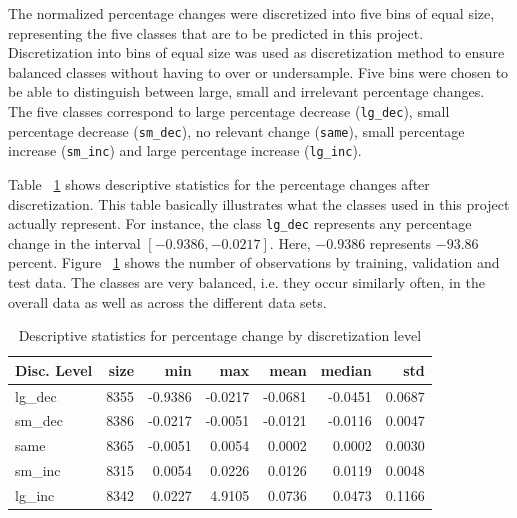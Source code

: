 \documentclass{article}
\begin{document}
	The normalized percentage changes were discretized into five bins of equal size, representing the five classes that are to be predicted in this project. Discretization into bins of equal size was used as discretization method to ensure balanced classes without having to over or undersample. Five bins were chosen to be able to distinguish between large, small and irrelevant percentage changes. The five classes correspond to large percentage decrease (\lstinline{lg_dec}), small percentage decrease (\lstinline{sm_dec}), no relevant change (\lstinline{same}), small percentage increase (\lstinline{sm_inc}) and large percentage increase (\lstinline{lg_inc}).
	
	Table ~\ref{table:stats_by_target} shows descriptive statistics for the percentage changes after discretization. This table basically illustrates what the classes used in this project actually represent. For instance, the class  \lstinline{lg_dec} represents any percentage change in the interval $[-0.9386, -0.0217]$. Here, $-0.9386$ represents $-93.86$ percent. Figure ~\ref{table:stats_by_target} shows the number of observations by training, validation and test data. The classes are very balanced, i.e. they occur similarly often, in the overall data as well as across the different data sets.
	
	\begin{table}[h!]
		\centering
		\caption{Descriptive statistics for percentage change by discretization level}
		\label{table:stats_by_target}
	
		\begin{tabular}{lrrrrrr}
			\toprule
			Disc. Level &  size &     min &     max &    mean &  median &     std \\
			\midrule
			lg\_dec &  8355 & -0.9386 & -0.0217 & -0.0681 & -0.0451 &  0.0687 \\
			sm\_dec &  8386 & -0.0217 & -0.0051 & -0.0121 & -0.0116 &  0.0047 \\
			same   &  8365 & -0.0051 &  0.0054 &  0.0002 &  0.0002 &  0.0030 \\
			sm\_inc &  8315 &  0.0054 &  0.0226 &  0.0126 &  0.0119 &  0.0048 \\
			lg\_inc &  8342 &  0.0227 &  4.9105 &  0.0736 &  0.0473 &  0.1166 \\
			\bottomrule
		\end{tabular}
	\end{table}%
\end{document}
